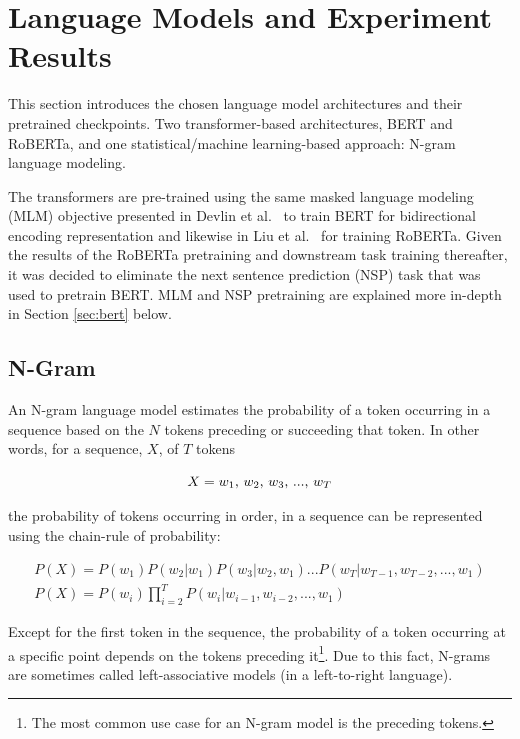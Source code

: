 \documentclass[12pt]{article}
\begin{document}
\section{Language Models and Experiment Results}\label{sec:language_models}
This section introduces the chosen language model architectures and their pretrained checkpoints. Two transformer-based architectures, BERT and
RoBERTa, and one statistical/machine learning-based approach: N-gram language modeling.

The transformers are pre-trained using the same masked language modeling (MLM) objective presented in Devlin et al.~\cite{devlin_bert_2019} to train
BERT for bidirectional encoding representation and likewise in Liu et al.~\cite{liu_roberta_2019} for training RoBERTa. Given the results of the
RoBERTa pretraining and downstream task training thereafter, it was decided to eliminate the next sentence prediction (NSP) task that was used to
pretrain BERT. MLM and NSP pretraining are explained more in-depth in Section \ref{sec:bert} below.

\subsection{N-Gram}\label{sec:ngram}
An N-gram language model estimates the probability of a token occurring in a sequence based on the $N$ tokens preceding or succeeding that token.
In other words, for a sequence, $X$, of $T$ tokens

\begin{equation}\label{eq:ngram_sequence}
    X = \mbox{$w_1$, $w_2$, $w_3$, ..., $w_T$}\\
\end{equation}

\noindent
the probability of tokens occurring in order, in a sequence can be represented using the chain-rule of probability:

\begin{equation}
    \begin{gathered}
        P(X) = P(w_1) P(w_2|w_1) P(w_3|w_2, w_1) ... P(w_T|w_{T-1}, w_{T-2}, ..., w_1)\\
        P(X) = P(w_i)\prod_{i=2}^{T} P(w_i|w_{i-1}, w_{i-2}, ..., w_1)
    \end{gathered}
\end{equation}

\noindent
Except for the first token in the sequence, the probability of a token occurring at a specific point depends on the tokens preceding
it\footnote{The most common use case for an N-gram model is the preceding tokens.}. Due to this fact, N-grams are sometimes called left-associative
models (in a left-to-right language).
\end{document}
